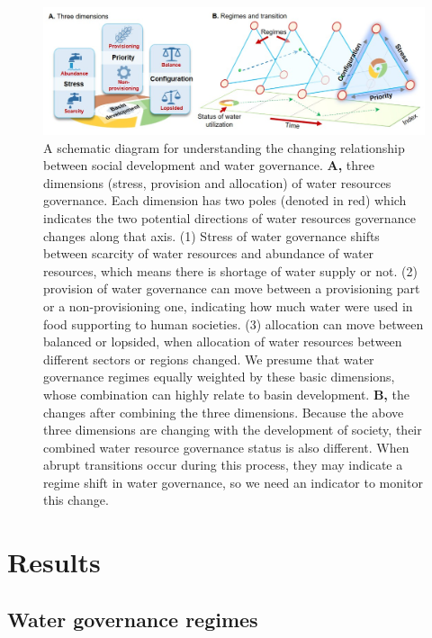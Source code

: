 \documentclass[9pt, twocolumn, twoside, lineno]{pnas-new}
\begin{document}
\begin{figure}%
	\centering
	\includegraphics[width=0.8\linewidth]{../../figures/main/framework.jpg}
	\caption{
		A schematic diagram for understanding the changing relationship between social development and water governance.
		\textbf{A,} three dimensions (stress, provision and allocation) of water resources governance. Each dimension has two poles (denoted in red) which indicates the two potential directions of water resources governance changes along that axis. (1) Stress of water governance shifts between scarcity of water resources and abundance of water resources, which means there is shortage of water supply or not. (2) provision of water governance can move between a provisioning part or a non-provisioning one, indicating how much water were used in food supporting to human societies. (3) allocation can move between balanced or lopsided, when allocation of water resources between different sectors or regions changed. We presume that water governance regimes equally weighted by these basic dimensions, whose combination can highly relate to basin development. 
		\textbf{B,} the changes after combining the three dimensions. Because the above three dimensions are changing with the development of society, their combined water resource governance status is also different. When abrupt transitions occur during this process, they may indicate a regime shift in water governance, so we need an indicator to monitor this change.
	}
	\label{fig:framework}
\end{figure}


\section*{Results}
\subsection*{Water governance regimes}
\end{document}
